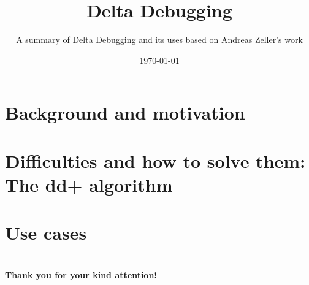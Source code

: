



\title[Delta Debugging]{Delta Debugging}
\subtitle{A summary of Delta Debugging and its uses based on Andreas Zeller's work}
\date{\today}




\titleframe

\section{Background and motivation}


\section{Difficulties and how to solve them: The dd+ algorithm}



\section{Use cases}



\section{}

\begin{frame}
	\begin{center}
		\large \textbf{Thank you for your kind attention!}
	\end{center}
\end{frame}

%

%

